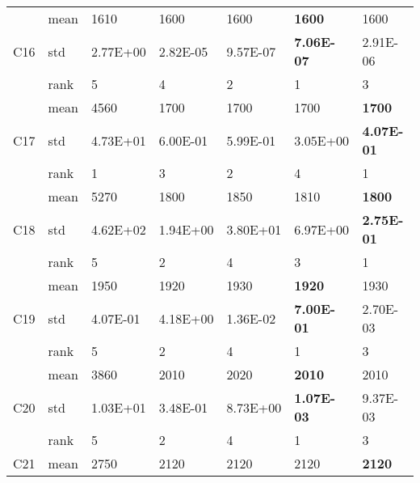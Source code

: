 \begin{table}[]
\begin{tabular}{|l|l|l|l|l|l|l|}
\multirow{3}{*}{C16} & mean & 1610     & 1600              & 1600              & \textbf{1600}     & 1600              \\ \cline{2-7} 
                     & std  & 2.77E+00 & 2.82E-05          & 9.57E-07          & \textbf{7.06E-07} & 2.91E-06          \\ \cline{2-7} 
                     & rank & 5        & 4                 & 2                 & 1                 & 3                 \\ \hline
\multirow{3}{*}{C17} & mean & 4560     & 1700              & 1700              & 1700              & \textbf{1700}     \\ \cline{2-7} 
                     & std  & 4.73E+01 & 6.00E-01          & 5.99E-01          & 3.05E+00          & \textbf{4.07E-01} \\ \cline{2-7} 
                     & rank & 1        & 3                 & 2                 & 4                 & 1                 \\ \hline
\multirow{3}{*}{C18} & mean & 5270     & 1800              & 1850              & 1810              & \textbf{1800}     \\ \cline{2-7} 
                     & std  & 4.62E+02 & 1.94E+00          & 3.80E+01          & 6.97E+00          & \textbf{2.75E-01} \\ \cline{2-7} 
                     & rank & 5        & 2                 & 4                 & 3                 & 1                 \\ \hline
\multirow{3}{*}{C19} & mean & 1950     & 1920              & 1930              & \textbf{1920}     & 1930              \\ \cline{2-7} 
                     & std  & 4.07E-01 & 4.18E+00          & 1.36E-02          & \textbf{7.00E-01} & 2.70E-03          \\ \cline{2-7} 
                     & rank & 5        & 2                 & 4                 & 1                 & 3                 \\ \hline
\multirow{3}{*}{C20} & mean & 3860     & 2010              & 2020              & \textbf{2010}     & 2010              \\ \cline{2-7} 
                     & std  & 1.03E+01 & 3.48E-01          & 8.73E+00          & \textbf{1.07E-03} & 9.37E-03          \\ \cline{2-7} 
                     & rank & 5        & 2                 & 4                 & 1                 & 3                 \\ \hline
\multirow{3}{*}{C21} & mean & 2750     & 2120              & 2120              & 2120              & \textbf{2120}     \\ \cline{2-7} 

\end{tabular}
\end{table}
